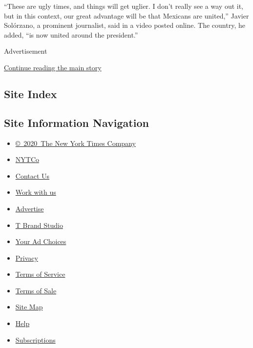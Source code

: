 ``These are ugly times, and things will get uglier. I don't really see a
way out it, but in this context, our great advantage will be that
Mexicans are united,'' Javier Solórzano, a prominent journalist, said in
a video posted online. The country, he added, ``is now united around the
president.''

Advertisement

\protect\hyperlink{after-bottom}{Continue reading the main story}

\hypertarget{site-index}{%
\subsection{Site Index}\label{site-index}}

\hypertarget{site-information-navigation}{%
\subsection{Site Information
Navigation}\label{site-information-navigation}}

\begin{itemize}
\tightlist
\item
  \href{https://help.nytimes.com/hc/en-us/articles/115014792127-Copyright-notice}{©~2020~The
  New York Times Company}
\end{itemize}

\begin{itemize}
\tightlist
\item
  \href{https://www.nytco.com/}{NYTCo}
\item
  \href{https://help.nytimes.com/hc/en-us/articles/115015385887-Contact-Us}{Contact
  Us}
\item
  \href{https://www.nytco.com/careers/}{Work with us}
\item
  \href{https://nytmediakit.com/}{Advertise}
\item
  \href{http://www.tbrandstudio.com/}{T Brand Studio}
\item
  \href{https://www.nytimes.com/privacy/cookie-policy\#how-do-i-manage-trackers}{Your
  Ad Choices}
\item
  \href{https://www.nytimes.com/privacy}{Privacy}
\item
  \href{https://help.nytimes.com/hc/en-us/articles/115014893428-Terms-of-service}{Terms
  of Service}
\item
  \href{https://help.nytimes.com/hc/en-us/articles/115014893968-Terms-of-sale}{Terms
  of Sale}
\item
  \href{https://spiderbites.nytimes.com}{Site Map}
\item
  \href{https://help.nytimes.com/hc/en-us}{Help}
\item
  \href{https://www.nytimes.com/subscription?campaignId=37WXW}{Subscriptions}
\end{itemize}
